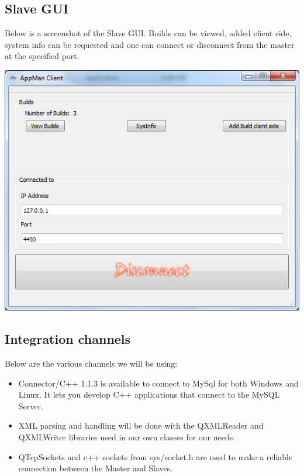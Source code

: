 \documentclass[a4paper,12pt,final]{article}
\begin{document}
 \subsection{Slave GUI}
Below is a screenshot of the Slave GUI. Builds can be viewed, added client side, system info can be requested and one can connect or disconnect from the master at the specified port.
\begin{center}
  	\includegraphics[scale=0.6]{AppManClientGui.png}
  \end{center} 
\subsection{Integration channels}
Below are the various channels we will be using:
\begin{itemize}
\item Connector/C++ 1.1.3 is available to connect to MySql for both Windows and Linux. It lets you develop C++ applications that connect to the MySQL Server.
\item XML parsing and handling will be done with the QXMLReader and QXMLWriter libraries used in our own classes for our needs.
\item QTcpSockets and c++ sockets from sys/socket.h are used to make a reliable connection between the Master and Slaves.
\end{itemize}
\newpage
\end{document}
